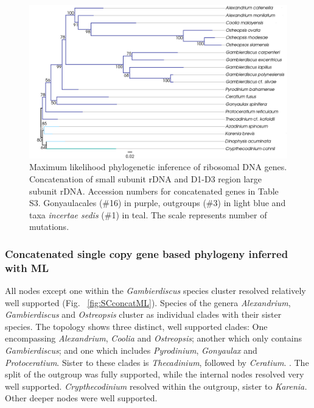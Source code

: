 \documentclass[12pt]{article}
\begin{document}
\begin{figure} 
\includegraphics[scale=.4]{figures/rDNA-ML.png} 
\caption{Maximum likelihood phylogenetic inference of ribosomal DNA genes. Concatenation of small subunit rDNA and D1-D3 region large subunit rDNA. Accession numbers for concatenated genes in Table S3. Gonyaulacales (\#16) in purple, outgroups (\#3) in light blue and taxa \textit{incertae sedis} (\#1) in teal. The scale represents number of mutations.} 
\label{fig:rdna}
\end{figure} 
\FloatBarrier

\subsubsection*{Concatenated single copy gene based phylogeny inferred with ML}
\FloatBarrier
All nodes except one within the \emph{Gambierdiscus} species cluster resolved relatively well supported (Fig. ~\ref{fig:SCconcatML}). 
Species of the genera \emph{Alexandrium}, \emph{Gambierdiscus} and \emph{Ostreopsis} cluster as individual clades with their sister species.  
The topology shows three distinct, well supported clades: 
One encompassing \emph{Alexandrium}, \emph{Coolia} and \emph{Ostreopsis}; another which only contains \emph{Gambierdiscus}; and one which includes \emph{Pyrodinium}, \emph{Gonyaulax} and \emph{Protoceratium}. 
Sister to these clades is \emph{Thecadinium}, followed by \emph{Ceratium}. .
The split of the outgroup was fully supported, while the internal nodes resolved very well supported. 
\emph{Crypthecodinium} resolved within the outgroup, sister to \emph{Karenia.} 
Other deeper nodes were well supported.
 
\end{document}
